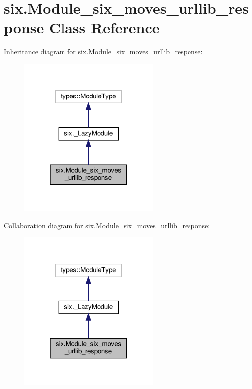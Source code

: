 \hypertarget{classsix_1_1Module__six__moves__urllib__response}{}\section{six.\+Module\+\_\+six\+\_\+moves\+\_\+urllib\+\_\+response Class Reference}
\label{classsix_1_1Module__six__moves__urllib__response}


Inheritance diagram for six.\+Module\+\_\+six\+\_\+moves\+\_\+urllib\+\_\+response\+:
\nopagebreak
\begin{figure}[H]
\begin{center}
\leavevmode
\includegraphics[width=196pt]{classsix_1_1Module__six__moves__urllib__response__inherit__graph}
\end{center}
\end{figure}


Collaboration diagram for six.\+Module\+\_\+six\+\_\+moves\+\_\+urllib\+\_\+response\+:
\nopagebreak
\begin{figure}[H]
\begin{center}
\leavevmode
\includegraphics[width=196pt]{classsix_1_1Module__six__moves__urllib__response__coll__graph}
\end{center}
\end{figure}
